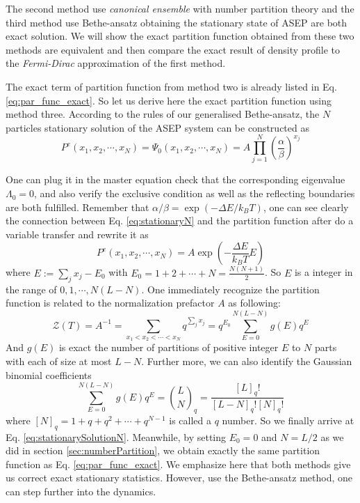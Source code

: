 \documentclass[aps,showpacs,twocolumn,floatfix,prx,superscriptaddress]{revtex4-1}
\begin{document}
The second method use \emph{canonical ensemble} with number partition theory and the third method use Bethe-ansatz obtaining the stationary state of ASEP are both exact solution. We will show the exact partition function obtained from these two methods are equivalent and then compare the exact result of density profile to the \emph{Fermi-Dirac} approximation of the first method.

The exact term of partition function from method two is already listed in Eq. \eqref{eq:par_func_exact}. So let us derive here the exact partition function using method three.
According to the rules of our generalised Bethe-ansatz, the $N$ particles stationary solution of the ASEP system can be constructed as
\begin{equation}
    \label{eq:stationaryN}
    P^e(x_1, x_2, \cdots, x_N) = \Psi_0(x_1, x_2, \cdots, x_N) =  A
    \prod_{j=1}^N\left(\frac{\alpha}{\beta}\right)^{x_j}
\end{equation}

One can plug it in the master equation check that the corresponding eigenvalue $\Lambda_0= 0$, and also verify the exclusive condition as well as the reflecting boundaries are both fulfilled.
Remember that $\alpha/\beta = \exp\left( - \Delta E / k_B T\right)$, one can see clearly the connection between Eq. \ref{eq:stationaryN} and the partition function after do a variable transfer and rewrite it as 
\begin{equation}
    \label{eq:stationaryNRewrite}
    P^e(x_1, x_2, \cdots, x_N) = A \exp\left( -\frac{\Delta E}{k_B T} E\right)
\end{equation}
where $E:=\sum_j{x_j}-E_0$ with $E_0 = 1 + 2 + \cdots + N = \frac{N(N+1)}{2}$. So $E$ is a integer in the range of $0, 1, \cdots, N(L-N)$. One immediately recognize the partition function is related to the normalization prefactor $A$ as following:
\begin{equation}
    \label{eq:partitionFuncBethe}
    \mathcal{Z}(T) = A^{-1} = \sum_{x_1 < x_2 < \cdots < x_N} q^{\sum_j{x_j}}
    = q^{E_0}\sum_{E=0}^{N(L-N)}g(E)q^E
\end{equation}
And $g(E)$ is exact the number of partitions of positive integer $E$ to $N$ parts with each of size at most $L-N$. Further more, we can also identify the Gaussian binomial coefficients
\begin{equation}
    \label{eq:degeneracy}
    \sum_{E=0}^{N(L-N)}g(E)q^E = \binom{L}{N}_q = \frac{[L]_q!}{[L-N]_q![N]_q!}
\end{equation}
where $[N]_q = 1 + q + q^2 + \cdots + q^{N-1}$ is called a $q$ number. So we finally arrive at Eq. \eqref{eq:stationarySolutionN}. Meanwhile, by setting $E_0 = 0$ and $N=L/2$ as we did in section \ref{sec:numberPartition}, we obtain exactly the same partition function as Eq. \eqref{eq:par_func_exact}. We emphasize here that both methods give us correct exact stationary statistics. However, use the Bethe-ansatz method, one can step further into the dynamics. 
\end{document}
